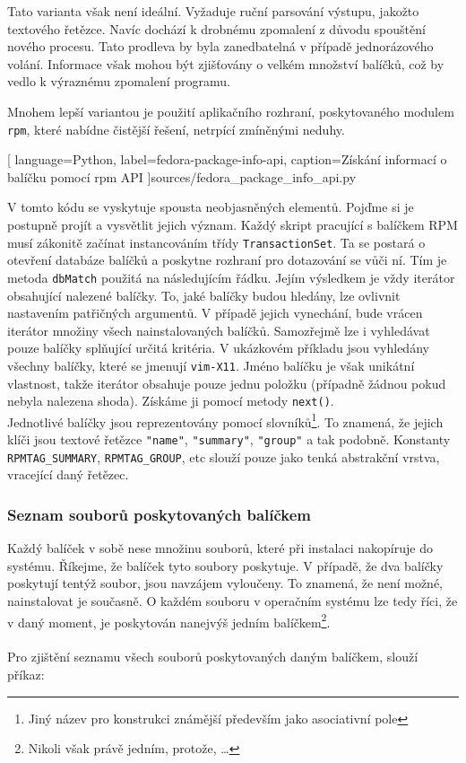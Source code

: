 \documentclass[10pt,a4paper]{article}
\begin{document}
			Tato varianta však není ideální. Vyžaduje ruční parsování výstupu, jakožto textového řetězce. Navíc dochází k drobnému zpomalení z důvodu spouštění nového procesu. Tato prodleva by byla zanedbatelná v případě jednorázového volání. Informace však mohou být zjišťovány o velkém množství balíčků, což by vedlo k výraznému zpomalení programu.

			Mnohem lepší variantou je použití aplikačního rozhraní, poskytovaného modulem \texttt{rpm}, které nabídne čistější řešení, netrpící zmíněnými neduhy.

			\newpage
			
			[
				language=Python,
				label=fedora-package-info-api,
				caption={Získání informací o balíčku pomocí rpm API}
			]{sources/fedora_package_info_api.py}

			V tomto kódu se vyskytuje spousta neobjasněných elementů. Pojďme si je postupně projít a vysvětlit jejich význam. Každý skript pracující s balíčkem RPM musí zákonitě začínat instancováním třídy \texttt{TransactionSet}. Ta se postará o otevření databáze balíčků a poskytne rozhraní pro dotazování se vůči ní. Tím je metoda \texttt{dbMatch} použitá na následujícím řádku. Jejím výsledkem je vždy iterátor obsahující nalezené balíčky. To, jaké balíčky budou hledány, lze ovlivnit nastavením patřičných argumentů. V případě jejich vynechání, bude vrácen iterátor množiny všech nainstalovaných balíčků. Samozřejmě lze i vyhledávat pouze balíčky splňující určitá kritéria. V ukázkovém příkladu jsou vyhledány všechny balíčky, které se jmenují \texttt{vim-X11}. Jméno balíčku je však unikátní vlastnost, takže iterátor obsahuje pouze jednu položku (případně žádnou pokud nebyla nalezena shoda). Získáme ji pomocí metody \texttt{next()}.
			\\
			Jednotlivé balíčky jsou reprezentovány pomocí slovníků\footnote{Jiný název pro konstrukci známější především jako asociativní pole}. To znamená, že jejich klíči jsou textové řetězce \texttt{"name"}, \texttt{"summary"}, \texttt{"group"} a tak podobně. Konstanty \texttt{RPMTAG\_SUMMARY}, \texttt{RPMTAG\_GROUP}, etc slouží pouze jako tenká abstrakční vrstva, vracející daný řetězec.

			\subsubsection{Seznam souborů poskytovaných balíčkem}
			Každý balíček v sobě nese množinu souborů, které při instalaci nakopíruje do systému. Říkejme, že balíček tyto soubory poskytuje. V případě, že dva balíčky poskytují tentýž soubor, jsou navzájem vyloučeny. To znamená, že není možné, nainstalovat je současně. O každém souboru v operačním systému lze tedy říci, že v daný moment, je poskytován nanejvýš jedním balíčkem\footnote{Nikoli však právě jedním, protože, \dots}.
			\\
			\\
			Pro zjištění seznamu všech souborů poskytovaných daným balíčkem, slouží příkaz:
\end{document}
